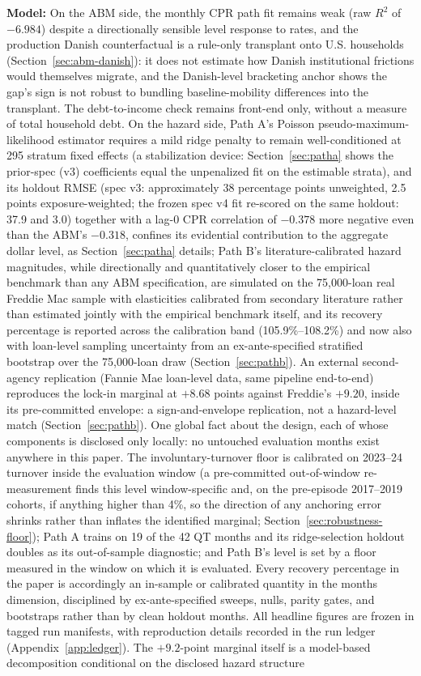 \documentclass[12pt]{article}
\begin{document}
\textbf{Model:} On the ABM side, the monthly CPR path fit remains weak (raw $R^2$ of $-6.984$) despite a directionally sensible level response to rates, and the production Danish counterfactual is a rule-only transplant onto U.S. households (Section~\ref{sec:abm-danish}): it does not estimate how Danish institutional frictions would themselves migrate, and the Danish-level bracketing anchor shows the gap's sign is not robust to bundling baseline-mobility differences into the transplant. The debt-to-income check remains front-end only, without a measure of total household debt. On the hazard side, Path A's Poisson pseudo-maximum-likelihood estimator requires a mild ridge penalty to remain well-conditioned at 295 stratum fixed effects (a stabilization device: Section~\ref{sec:patha} shows the prior-spec (v3) coefficients equal the unpenalized fit on the estimable strata), and its holdout RMSE (spec v3: approximately 38 percentage points unweighted, 2.5 points exposure-weighted; the frozen spec v4 fit re-scored on the same holdout: 37.9 and 3.0) together with a lag-0 CPR correlation of $-0.378$ more negative even than the ABM's $-0.318$, confines its evidential contribution to the aggregate dollar level, as Section~\ref{sec:patha} details; Path B's literature-calibrated hazard magnitudes, while directionally and quantitatively closer to the empirical benchmark than any ABM specification, are simulated on the 75,000-loan real Freddie Mac sample with elasticities calibrated from secondary literature rather than estimated jointly with the empirical benchmark itself, and its recovery percentage is reported across the calibration band (105.9\%--108.2\%) and now also with loan-level sampling uncertainty from an ex-ante-specified stratified bootstrap over the 75,000-loan draw (Section~\ref{sec:pathb}). An external second-agency replication (Fannie Mae loan-level data, same pipeline end-to-end) reproduces the lock-in marginal at $+8.68$ points against Freddie's $+9.20$, inside its pre-committed envelope: a sign-and-envelope replication, not a hazard-level match (Section~\ref{sec:pathb}). One global fact about the design, each of whose components is disclosed only locally: no untouched evaluation months exist anywhere in this paper. The involuntary-turnover floor is calibrated on 2023--24 turnover inside the evaluation window (a pre-committed out-of-window re-measurement finds this level window-specific and, on the pre-episode 2017--2019 cohorts, if anything higher than 4\%, so the direction of any anchoring error shrinks rather than inflates the identified marginal; Section~\ref{sec:robustness-floor}); Path A trains on 19 of the 42 QT months and its ridge-selection holdout doubles as its out-of-sample diagnostic; and Path B's level is set by a floor measured in the window on which it is evaluated. Every recovery percentage in the paper is accordingly an in-sample or calibrated quantity in the months dimension, disciplined by ex-ante-specified sweeps, nulls, parity gates, and bootstraps rather than by clean holdout months. All headline figures are frozen in tagged run manifests, with reproduction details recorded in the run ledger (Appendix~\ref{app:ledger}). The $+9.2$-point marginal itself is a model-based decomposition conditional on the disclosed hazard structure 
\end{document}
